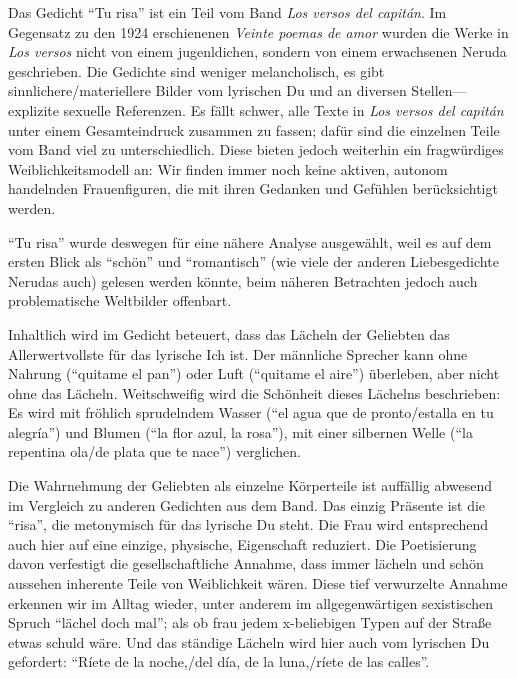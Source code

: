 Das Gedicht ``Tu risa'' ist ein Teil vom Band \textit{Los versos del capitán}.
Im Gegensatz zu den 1924 erschienenen \textit{Veinte poemas de amor} wurden die Werke in \textit{Los versos} nicht von einem jugenldichen, sondern von einem erwachsenen Neruda geschrieben.
Die Gedichte sind weniger melancholisch, es gibt sinnlichere/materiellere Bilder vom lyrischen Du und an diversen Stellen—explizite sexuelle Referenzen.
Es fällt schwer, alle Texte in \textit{Los versos del capitán} unter einem Gesamteindruck zusammen zu fassen;
dafür sind die einzelnen Teile vom Band viel zu unterschiedlich.
Diese bieten jedoch weiterhin ein fragwürdiges Weiblichkeitsmodell an:
Wir finden immer noch keine aktiven, autonom handelnden Frauenfiguren, die mit ihren Gedanken und Gefühlen berücksichtigt werden.

``Tu risa'' wurde deswegen für eine nähere Analyse ausgewählt, weil es auf dem ersten Blick als ``schön'' und ``romantisch'' (wie viele der anderen Liebesgedichte Nerudas auch) gelesen werden könnte, %
beim näheren Betrachten jedoch auch problematische Weltbilder offenbart.

Inhaltlich wird im Gedicht beteuert, dass das Lächeln der Geliebten das Allerwertvollste für das lyrische Ich ist.
Der männliche Sprecher kann ohne Nahrung (``quitame el pan'') oder Luft (``quitame el aire'') überleben, aber nicht ohne das Lächeln.
Weitschweifig wird die Schönheit dieses Lächelns beschrieben:
Es wird mit fröhlich sprudelndem Wasser (``el agua que de pronto/estalla en tu alegría'') und Blumen (``la flor azul, la rosa''), mit einer silbernen Welle (``la repentina ola/de plata que te nace'') verglichen.

Die Wahrnehmung der Geliebten als einzelne Körperteile ist auffällig abwesend im Vergleich zu anderen Gedichten aus dem Band.
Das einzig Präsente ist die ``risa'', die metonymisch für das lyrische Du steht.
Die Frau wird entsprechend auch hier auf eine einzige, physische, Eigenschaft reduziert.
Die Poetisierung davon verfestigt die gesellschaftliche Annahme, dass immer lächeln und schön aussehen inherente Teile von Weiblichkeit wären.
Diese tief verwurzelte Annahme erkennen wir im Alltag wieder, unter anderem im allgegenwärtigen sexistischen Spruch ``lächel doch mal''; als ob frau jedem x-beliebigen Typen auf der Straße etwas schuld wäre.
Und das ständige Lächeln wird hier auch vom lyrischen Du gefordert: ``Ríete de la noche,/del día, de la luna,/ríete de las calles''.

